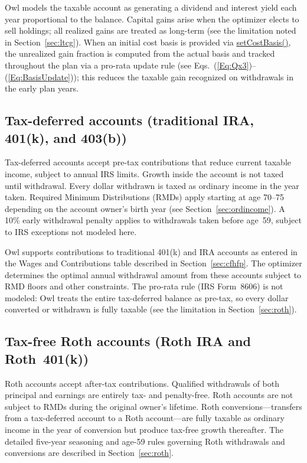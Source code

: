 \documentclass[fleqn,12pt]{report}
\newcommand{\code}[1]{\url{#1}}
\begin{document}
Owl models the taxable account as generating a dividend and interest yield
each year proportional to the balance.
Capital gains arise when the optimizer elects to sell holdings; all realized
gains are treated as long-term (see the limitation noted in
Section~\ref{sec:ltcg}).
When an initial cost basis is provided via \code{setCostBasis()}, the
unrealized gain fraction is computed from the actual basis and tracked
throughout the plan via a pro-rata update rule
(see Eqs.~(\ref{Eq:Qx3})--(\ref{Eq:BasisUpdate}));
this reduces the taxable gain recognized on withdrawals in the early plan years.

\subsection*{Tax-deferred accounts (traditional IRA, 401(k), and 403(b))}

Tax-deferred accounts accept pre-tax contributions that reduce current taxable
income, subject to annual IRS limits.
Growth inside the account is not taxed until withdrawal.
Every dollar withdrawn is taxed as ordinary income in the year taken.
Required Minimum Distributions (RMDs) apply starting at age 70--75 depending
on the account owner's birth year (see Section~\ref{sec:ordincome}).
A 10\% early withdrawal penalty applies to withdrawals taken before
age~59\textonehalf, subject to IRS exceptions not modeled here.

Owl supports contributions to traditional 401(k) and IRA accounts as entered
in the Wages and Contributions table described in Section~\ref{sec:cfhfp}.
The optimizer determines the optimal annual withdrawal amount from these
accounts subject to RMD floors and other constraints.
The pro-rata rule (IRS Form~8606) is not modeled: Owl treats the entire
tax-deferred balance as pre-tax, so every dollar converted or withdrawn is
fully taxable (see the limitation in Section~\ref{sec:roth}).

\subsection*{Tax-free Roth accounts (Roth IRA and Roth~401(k))}

Roth accounts accept after-tax contributions.
Qualified withdrawals of both principal and earnings are entirely tax- and
penalty-free.
Roth accounts are not subject to RMDs during the original owner's lifetime.
Roth conversions---transfers from a tax-deferred account to a Roth
account---are fully taxable as ordinary income in the year of conversion but
produce tax-free growth thereafter.
The detailed five-year seasoning and age-59\textonehalf{} rules governing
Roth withdrawals and conversions are described in Section~\ref{sec:roth}.
\end{document}
